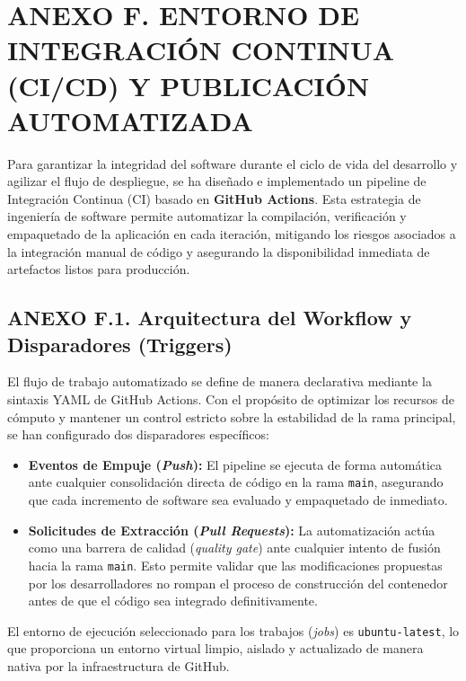 \section{ANEXO F. ENTORNO DE INTEGRACIÓN CONTINUA (CI/CD) Y PUBLICACIÓN
AUTOMATIZADA}\label{anexo-f.-entorno-de-integraciuxf3n-continua-cicd-y-publicaciuxf3n-automatizada}

Para garantizar la integridad del software durante el ciclo de vida del
desarrollo y agilizar el flujo de despliegue, se ha diseñado e
implementado un pipeline de Integración Continua (CI) basado en
\textbf{GitHub Actions}. Esta estrategia de ingeniería de software
permite automatizar la compilación, verificación y empaquetado de la
aplicación en cada iteración, mitigando los riesgos asociados a la
integración manual de código y asegurando la disponibilidad inmediata de
artefactos listos para producción.

\subsection{ANEXO F.1. Arquitectura del Workflow y Disparadores
(Triggers)}\label{anexo-f.1.-arquitectura-del-workflow-y-disparadores-triggers}

El flujo de trabajo automatizado se define de manera declarativa
mediante la sintaxis YAML de GitHub Actions. Con el propósito de
optimizar los recursos de cómputo y mantener un control estricto sobre
la estabilidad de la rama principal, se han configurado dos disparadores
específicos:

\begin{itemize}
\item
  \textbf{Eventos de Empuje (\emph{Push}):} El pipeline se ejecuta de
  forma automática ante cualquier consolidación directa de código en la
  rama \texttt{main}, asegurando que cada incremento de software sea
  evaluado y empaquetado de inmediato.
\item
  \textbf{Solicitudes de Extracción (\emph{Pull Requests}):} La
  automatización actúa como una barrera de calidad (\emph{quality gate})
  ante cualquier intento de fusión hacia la rama \texttt{main}. Esto
  permite validar que las modificaciones propuestas por los
  desarrolladores no rompan el proceso de construcción del contenedor
  antes de que el código sea integrado definitivamente.
\end{itemize}

El entorno de ejecución seleccionado para los trabajos (\emph{jobs}) es
\texttt{ubuntu-latest}, lo que proporciona un entorno virtual limpio,
aislado y actualizado de manera nativa por la infraestructura de GitHub.

